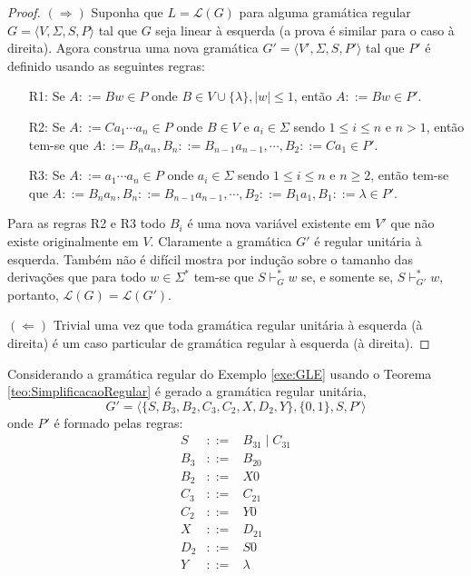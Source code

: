 \begin{proof}
	$(\Rightarrow)$ Suponha que $L = \mathcal{L}(G)$ para alguma gramática regular $G = \langle V, \Sigma, S, P \rangle$ tal que $G$ seja linear à esquerda (a prova é similar para o caso à direita). Agora construa uma nova gramática $G' = \langle V', \Sigma, S, P' \rangle$ tal que $P'$ é definido usando as seguintes regras: 
		
	\begin{itemize}
		\item[R1:] Se $A ::= Bw \in P$ onde $B \in V \cup \{\lambda\},  |w| \leq 1$, então $A ::= Bw \in P'$.
		\item[R2:] Se $A ::= Ca_1\cdots a_n \in P$ onde $B \in V$ e $a_i \in \Sigma$ sendo $1 \leq i \leq n$ e $n > 1$, então tem-se que $A ::= B_na_n, B_n ::= B_{n-1}a_{n-1}, \cdots, B_2 ::= Ca_1 \in P'$.
		\item[R3:] Se $A ::= a_1\cdots a_n \in P$ onde $a_i \in \Sigma$ sendo $1 \leq i \leq n$ e $n \geq 2$, então tem-se que $A ::= B_na_n, B_n ::= B_{n-1}a_{n-1}, \cdots, B_2 ::= B_1a_1, B_1 ::= \lambda \in P'$.
	\end{itemize}

	Para as regras R2 e R3 todo $B_i$ é uma nova variável existente em $V'$ que não existe originalmente em $V$. Claramente a gramática $G'$ é regular unitária à esquerda. Também não é difícil mostra por indução sobre o tamanho das derivações que para todo $w \in \Sigma^*$ tem-se que $S \vdash^*_G w$ se, e somente se, $S \vdash^*_{G'} w$, portanto, $\mathcal{L}(G) = \mathcal{L}(G')$.
	
	$(\Leftarrow)$ Trivial uma vez que toda gramática regular unitária à esquerda (à direita) é um caso particular de gramática regular à esquerda (à direita).
\end{proof}

\begin{exemplo}\label{exe:GRU}
	Considerando a gramática regular do Exemplo \ref{exe:GLE} usando o Teorema \ref{teo:SimplificacaoRegular} é gerado a gramática regular unitária, 
	$$G' = \langle \{S, B_3, B_2, C_3, C_2, X, D_2, Y\}, \{0, 1\}, S, P'\rangle$$ 
	onde $P'$ é formado pelas regras:
	\begin{eqnarray*}
		S & ::= & B_31 \mid C_31\\
		B_3 & ::= & B_20\\
		B_2 & ::= & X0\\
		C_3 & ::= & C_21\\
		C_2 & ::= & Y0\\
		X & ::= & D_21\\
		D_2 & ::=& S0\\
		Y & ::= & \lambda
	\end{eqnarray*}
\end{exemplo}

